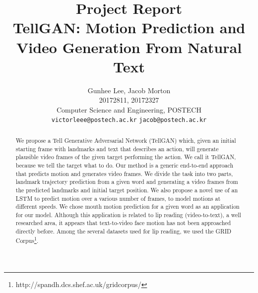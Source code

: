 \documentclass[10pt,twocolumn,letterpaper]{article}
\begin{document}
\title{Project Report\\
TellGAN: Motion Prediction and Video Generation From Natural Text}

\author{Gunhee Lee, Jacob Morton\\
20172811, 20172327\\
Computer Science and Engineering, POSTECH\\
{\tt\small victorleee@postech.ac.kr}
{\tt\small jacob@postech.ac.kr}
}


\maketitle



\begin{abstract}

 We propose a Tell Generative Adversarial Network (TellGAN) which, given an initial starting frame with landmarks and text that describes an action, will generate plausible video frames of the given target performing the action. We call it TellGAN, because we tell the target what to do. Our method is a generic end-to-end approach that predicts motion and generates video frames. We divide the task into two parts, landmark trajectory prediction from a given word and generating a video frames from the predicted landmarks and initial target position. We also propose a novel use of an LSTM to predict motion over a various number of frames, to model motions at different speeds. We chose mouth motion prediction for a given word as an application for our model. Although this application is related to lip reading (video-to-text), a well researched area, it appears that text-to-video face motion has not been approached directly before.  Among the several datasets used for lip reading, we used the GRID Corpus\footnote{http://spandh.dcs.shef.ac.uk/gridcorpus/}.
 
\end{abstract}
\end{document}
